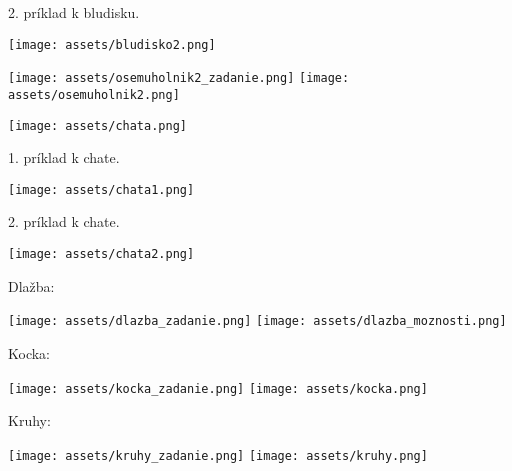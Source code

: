 \begin{example}
	2. príklad k bludisku. \\
	
	\begin{center}
		\texttt{[image: assets/bludisko2.png]}
	\end{center}
\end{example}

\begin{example}
	\begin{center}
		\texttt{[image: assets/osemuholnik2\_zadanie.png]}
		\texttt{[image: assets/osemuholnik2.png]}
	\end{center}
\end{example}


	
\begin{center}
	\texttt{[image: assets/chata.png]}
\end{center}

\begin{example}
	1. príklad k chate.
	\begin{center}
		\texttt{[image: assets/chata1.png]}
	\end{center}
\end{example}

\begin{example}
	2. príklad k chate.
	
	\begin{center}
		\texttt{[image: assets/chata2.png]}
	\end{center}
\end{example}

\begin{example}
	Dlažba:
	
	\begin{center}
		\texttt{[image: assets/dlazba\_zadanie.png]}
		\texttt{[image: assets/dlazba\_moznosti.png]}
	\end{center}
\end{example}

\begin{example}
	Kocka:
	\begin{center}
		\texttt{[image: assets/kocka\_zadanie.png]}
		\texttt{[image: assets/kocka.png]}
	\end{center}
\end{example}

\begin{example}
	Kruhy:
	
	\begin{center}
		\texttt{[image: assets/kruhy\_zadanie.png]}
		\texttt{[image: assets/kruhy.png]}
	\end{center}
\end{example}

